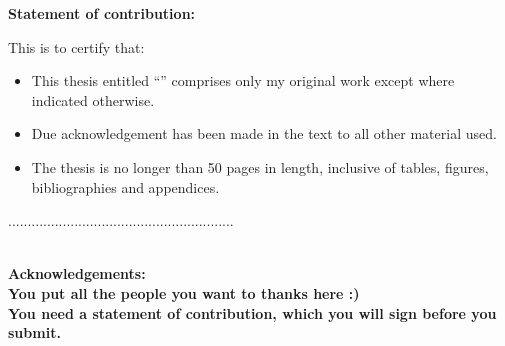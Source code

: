 


\bfseries{Statement of contribution:}\mdseries\\
\vspace{1.0cm}

This is to certify that:\\

\begin{itemize}

\item This thesis entitled ``\mytitle{}'' comprises only my original work except where indicated otherwise.

\item Due acknowledgement has been made in the text to all other material used.

\item The thesis is no longer than 50 pages in length, inclusive of tables, figures, bibliographies and
appendices.

\end{itemize}

\vspace{4.0cm}


\scriptsize{..........................................................}\normalsize\\
\newline
\vspace{3.0cm}
\indent \myname\\
      					 
\vspace{2.0cm}

\bfseries{Acknowledgements:}\mdseries\\

You put all the people you want to thanks here :)\\

You need a statement of contribution, which you will sign before you submit. 